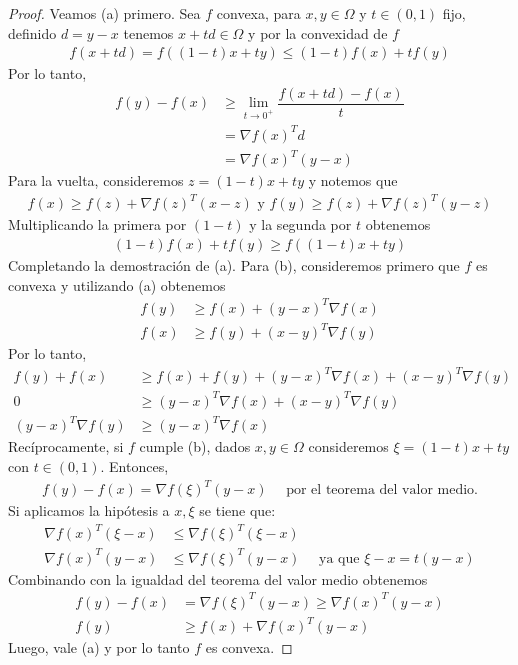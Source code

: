 \documentclass{article}
\begin{document}
\begin{proof}
  Veamos (a) primero. Sea \( f \) convexa, para \(x, y \in \Omega \) y \( t \in (0, 1) \) fijo, definido \( d = y - x \) tenemos \( x + td \in \Omega \) y por la convexidad de \( f \) \begin{align*}
    f(x + td) = f\left((1-t)x + ty \right) \leq (1-t) f(x) + t f(y)
  \end{align*}
  Por lo tanto, \begin{align*}
    f(y) - f(x) & \geq \lim_{t \to 0^+} \dfrac{f(x+td) - f(x)}{ t} \\
                & = \nabla {f(x)}^T d                              \\
                & = \nabla {f(x)}^T (y - x)
  \end{align*}
  Para la vuelta, consideremos \( z = (1-t)x + ty \) y notemos que \begin{align*}
    f(x) \geq f(z) + \nabla {f(z)}^T (x-z) \text{ y } f(y) \geq f(z) + \nabla {f(z)}^T (y-z)
  \end{align*}
  Multiplicando la primera por \( (1-t) \) y la segunda por \( t \) obtenemos \begin{align*}
    (1-t) f(x) + t f(y) \geq f\left( (1-t)x + ty \right)
  \end{align*}
  Completando la demostración de (a). Para (b), consideremos primero que \( f \) es convexa y utilizando (a) obtenemos \begin{align*}
    f(y) & \geq f(x) + {(y-x)}^T \nabla f(x) \\
    f(x) & \geq f(y) + {(x-y)}^T \nabla f(y)
  \end{align*}
  Por lo tanto, \begin{align*}
    f(y) + f(x)           & \geq f(x) + f(y) + {(y-x)}^T \nabla f(x) + {(x-y)}^T \nabla f(y) \\
    0                     & \geq {(y-x)}^T \nabla f(x) + {(x-y)}^T \nabla f(y)               \\
    {(y-x)}^T \nabla f(y) & \geq {(y-x)}^T \nabla f(x)
  \end{align*}
  Recíprocamente, si \( f \) cumple (b), dados \( x, y \in \Omega \) consideremos \( \xi = (1-t)x + ty \) con \( t \in (0, 1) \). Entonces, \begin{align*}
    f(y) - f(x) = \nabla {f(\xi)}^T (y-x) \quad \text{ por el teorema del valor medio.}
  \end{align*}
  Si aplicamos la hipótesis a \( x, \xi \) se tiene que: \begin{align*}
    \nabla {f(x)}^T (\xi - x) & \leq \nabla {f(\xi)}^T (\xi - x)                                    \\
    \nabla {f(x)}^T (y - x)   & \leq \nabla {f(\xi)}^T (y-x) \quad \text{ ya que } \xi - x = t(y-x)
  \end{align*}
  Combinando con la igualdad del teorema del valor medio obtenemos \begin{align*}
    f(y) - f(x) & = \nabla {f(\xi)}^T (y-x) \geq \nabla {f(x)}^T (y-x) \\
    f(y)        & \geq f(x) + \nabla {f(x)}^T (y-x)
  \end{align*}
  Luego, vale (a) y por lo tanto \( f \) es convexa.
\end{proof}
\end{document}
